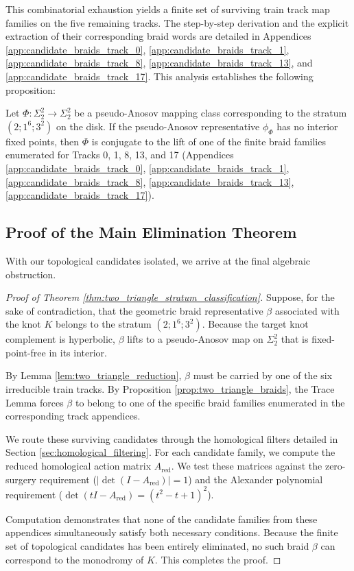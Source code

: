 This combinatorial exhaustion yields a finite set of surviving train track map families on the five remaining tracks. The step-by-step derivation and the explicit extraction of their corresponding braid words are detailed in Appendices \ref{app:candidate_braids_track_0}, \ref{app:candidate_braids_track_1}, \ref{app:candidate_braids_track_8}, \ref{app:candidate_braids_track_13}, and \ref{app:candidate_braids_track_17}. This analysis establishes the following proposition:

\begin{prop}\label{prop:two_triangle_braids}
    Let $\Phi \colon \Sigma_2^2 \to \Sigma_2^2$ be a pseudo-Anosov mapping class corresponding to the stratum $(2;1^6;3^2)$ on the disk. If the pseudo-Anosov representative $\phi_\Phi$ has no interior fixed points, then $\Phi$ is conjugate to the lift of one of the finite braid families enumerated for Tracks 0, 1, 8, 13, and 17 (Appendices \ref{app:candidate_braids_track_0}, \ref{app:candidate_braids_track_1}, \ref{app:candidate_braids_track_8}, \ref{app:candidate_braids_track_13}, \ref{app:candidate_braids_track_17}).
\end{prop}

\subsection{Proof of the Main Elimination Theorem}

With our topological candidates isolated, we arrive at the final algebraic obstruction.

\begin{proof}[Proof of Theorem \ref{thm:two_triangle_stratum_classification}]
    Suppose, for the sake of contradiction, that the geometric braid representative $\beta$ associated with the knot $K$ belongs to the stratum $(2;1^6;3^2)$. Because the target knot complement is hyperbolic, $\beta$ lifts to a pseudo-Anosov map on $\Sigma_2^2$ that is fixed-point-free in its interior.

    By Lemma \ref{lem:two_triangle_reduction}, $\beta$ must be carried by one of the six irreducible train tracks. By Proposition \ref{prop:two_triangle_braids}, the Trace Lemma forces $\beta$ to belong to one of the specific braid families enumerated in the corresponding track appendices.

    We route these surviving candidates through the homological filters detailed in Section \ref{sec:homological_filtering}. For each candidate family, we compute the reduced homological action matrix $A_{\text{red}}$. We test these matrices against the zero-surgery requirement ($|\det(I - A_{\text{red}})| = 1$) and the Alexander polynomial requirement ($\det(tI - A_{\text{red}}) = (t^2-t+1)^2$).

    Computation demonstrates that none of the candidate families from these appendices simultaneously satisfy both necessary conditions. Because the finite set of topological candidates has been entirely eliminated, no such braid $\beta$ can correspond to the monodromy of $K$. This completes the proof.
\end{proof}
